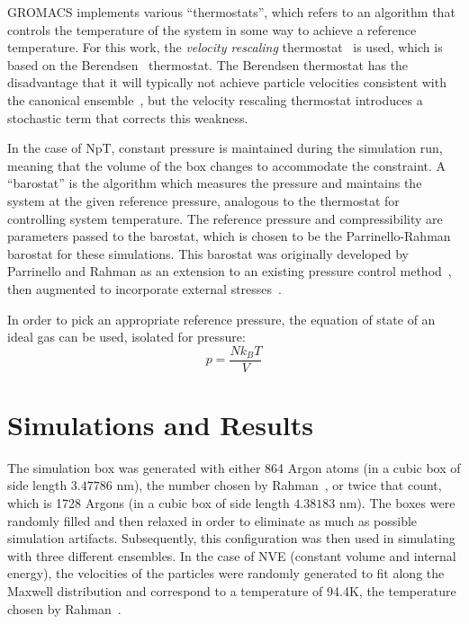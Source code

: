 \documentclass[12pt]{article}
\begin{document}
GROMACS implements various ``thermostats'', which refers to an algorithm that controls the temperature of the system in some way to achieve a reference temperature. For this work, the \textit{velocity rescaling} thermostat~\cite{Bussi2009} is used, which is based on the Berendsen~\cite{Berendsen1984} thermostat. The Berendsen thermostat has the disadvantage that it will typically not achieve particle velocities consistent with the canonical ensemble~\cite{Harvey_1998}, but the velocity rescaling thermostat introduces a stochastic term that corrects this weakness.


In the case of NpT, constant pressure is maintained during the simulation run, meaning that the volume of the box changes to accommodate the constraint. A ``barostat'' is the algorithm which measures the pressure and maintains the system at the given reference pressure, analogous to the thermostat for controlling system temperature. 
The reference pressure and compressibility are parameters passed to the barostat, which is chosen to be the Parrinello-Rahman barostat for these simulations. This barostat was originally developed by Parrinello and Rahman as an extension to an existing pressure control method~\cite{Parrinello1980}, then augmented to incorporate external stresses~\cite{Parrinello1981}.

In order to pick an appropriate reference pressure, the equation of state of an ideal gas can be used, isolated for pressure:
\begin{equation}
	p = \frac{N k_B T}{V}
\end{equation}


\section{Simulations and Results}

The simulation box was generated with either 864 Argon atoms (in a cubic box of side length $3.47786\text{ nm}$), the number chosen by Rahman~\cite{Rahman1964}, or twice that count, which is 1728 Argons (in a cubic box of side length $4.38183\text{ nm}$). The boxes were randomly filled and then relaxed in order to eliminate as much as possible simulation artifacts. Subsequently, this configuration was then used in simulating with three different ensembles. In the case of NVE (constant volume and internal energy), the velocities of the particles were randomly generated to fit along the Maxwell distribution and correspond to a temperature of 94.4K, the temperature chosen by Rahman~\cite{Rahman1964}.
\end{document}
